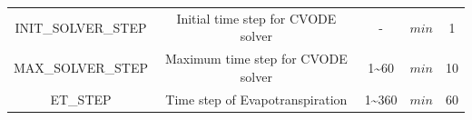 \documentclass[]{scrbook}
\begin{document}
\begin{longtable}[]{@{}ccccc@{}}
\begin{minipage}[t]{0.17\columnwidth}\centering\strut
INIT\_SOLVER\_STEP\strut
\end{minipage} & \begin{minipage}[t]{0.23\columnwidth}\centering\strut
Initial time step for CVODE solver\strut
\end{minipage} & \begin{minipage}[t]{0.10\columnwidth}\centering\strut
-\strut
\end{minipage} & \begin{minipage}[t]{0.10\columnwidth}\centering\strut
\(min\)\strut
\end{minipage} & \begin{minipage}[t]{0.26\columnwidth}\centering\strut
1\strut
\end{minipage}\tabularnewline
\begin{minipage}[t]{0.17\columnwidth}\centering\strut
MAX\_SOLVER\_STEP\strut
\end{minipage} & \begin{minipage}[t]{0.23\columnwidth}\centering\strut
Maximum time step for CVODE solver\strut
\end{minipage} & \begin{minipage}[t]{0.10\columnwidth}\centering\strut
1\textasciitilde{}60\strut
\end{minipage} & \begin{minipage}[t]{0.10\columnwidth}\centering\strut
\(min\)\strut
\end{minipage} & \begin{minipage}[t]{0.26\columnwidth}\centering\strut
10\strut
\end{minipage}\tabularnewline
\begin{minipage}[t]{0.17\columnwidth}\centering\strut
ET\_STEP\strut
\end{minipage} & \begin{minipage}[t]{0.23\columnwidth}\centering\strut
Time step of Evapotranspiration\strut
\end{minipage} & \begin{minipage}[t]{0.10\columnwidth}\centering\strut
1\textasciitilde{}360\strut
\end{minipage} & \begin{minipage}[t]{0.10\columnwidth}\centering\strut
\(min\)\strut
\end{minipage} & \begin{minipage}[t]{0.26\columnwidth}\centering\strut
60\strut
\end{minipage}\tabularnewline

\end{longtable}
\end{document}
